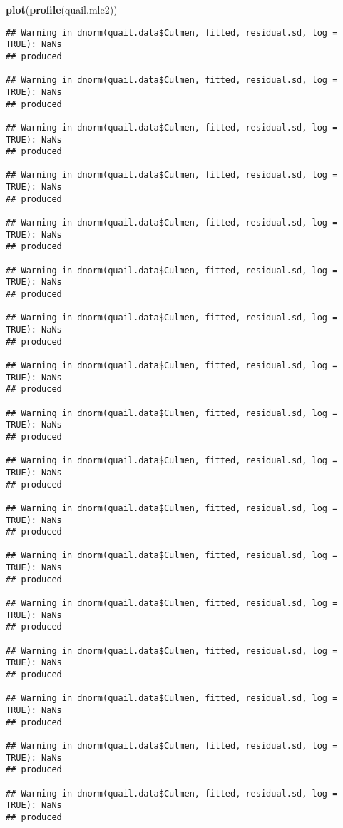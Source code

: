 \documentclass[]{article}
\newenvironment{Shaded}{\begin{snugshade}}{\end{snugshade}}
\newcommand{\KeywordTok}[1]{\textcolor[rgb]{0.13,0.29,0.53}{\textbf{#1}}}
\newcommand{\NormalTok}[1]{#1}
\begin{document}
\begin{Shaded}
\begin{Highlighting}[]
\KeywordTok{plot}\NormalTok{(}\KeywordTok{profile}\NormalTok{(quail.mle2))}
\end{Highlighting}
\end{Shaded}

\begin{verbatim}
## Warning in dnorm(quail.data$Culmen, fitted, residual.sd, log = TRUE): NaNs
## produced

## Warning in dnorm(quail.data$Culmen, fitted, residual.sd, log = TRUE): NaNs
## produced

## Warning in dnorm(quail.data$Culmen, fitted, residual.sd, log = TRUE): NaNs
## produced

## Warning in dnorm(quail.data$Culmen, fitted, residual.sd, log = TRUE): NaNs
## produced

## Warning in dnorm(quail.data$Culmen, fitted, residual.sd, log = TRUE): NaNs
## produced

## Warning in dnorm(quail.data$Culmen, fitted, residual.sd, log = TRUE): NaNs
## produced

## Warning in dnorm(quail.data$Culmen, fitted, residual.sd, log = TRUE): NaNs
## produced

## Warning in dnorm(quail.data$Culmen, fitted, residual.sd, log = TRUE): NaNs
## produced

## Warning in dnorm(quail.data$Culmen, fitted, residual.sd, log = TRUE): NaNs
## produced

## Warning in dnorm(quail.data$Culmen, fitted, residual.sd, log = TRUE): NaNs
## produced

## Warning in dnorm(quail.data$Culmen, fitted, residual.sd, log = TRUE): NaNs
## produced

## Warning in dnorm(quail.data$Culmen, fitted, residual.sd, log = TRUE): NaNs
## produced

## Warning in dnorm(quail.data$Culmen, fitted, residual.sd, log = TRUE): NaNs
## produced

## Warning in dnorm(quail.data$Culmen, fitted, residual.sd, log = TRUE): NaNs
## produced

## Warning in dnorm(quail.data$Culmen, fitted, residual.sd, log = TRUE): NaNs
## produced

## Warning in dnorm(quail.data$Culmen, fitted, residual.sd, log = TRUE): NaNs
## produced

## Warning in dnorm(quail.data$Culmen, fitted, residual.sd, log = TRUE): NaNs
## produced


\end{verbatim}
\end{document}
